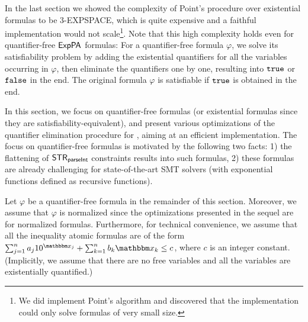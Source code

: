 
In the last section we showed the complexity of Point's procedure over existential {\paexp} formulas to be 3-EXPSPACE, which  is quite expensive and a faithful implementation would not scale\footnote{We did implement Point's algorithm and discovered that the implementation could only solve formulas of very small size.}.
Note that this high complexity holds even for quantifier-free ${\sf ExpPA}$ formulas: For a quantifier-free formula $\varphi$, we solve its satisfiability problem by adding the existential quantifiers for all the variables occurring in $\varphi$, then eliminate the quantifiers one by one, resulting into $\mathtt{true}$ or $\mathtt{false}$ in the end. The original formula $\varphi$ is satisfiable if $\mathtt{true}$ is obtained in the end.


In this section, we focus on quantifier-free {\paexp} formulas (or existential {\paexp} formulas since they are satisfiability-equivalent), and present various optimizations of the quantifier elimination procedure for {\paexp}, aiming at an efficient implementation. The focus on quantifier-free {\paexp} formulas is motivated by the following two facts: 1) the flattening of {${\sf STR}_{\textsf{parseInt}}$} constraints results into such formulas, 2) these formulas are already challenging for state-of-the-art SMT solvers (with exponential functions defined as recursive functions). 

Let $\varphi$ be a quantifier-free {\paexp} formula in the remainder of this section. Moreover, we assume that $\varphi$ is normalized since the optimizations presented in the sequel are for normalized formulas. Furthermore, for technical convenience, we assume that all the inequality atomic formulas are of the form 
%
$\sum_{j=1}^{n} a_j 10^{\ivarx_{j}} + \sum_{k=1}^{n}b_k \ivarx_{k} \le c$, 
%
where $c$ is an integer constant. (Implicitly, we assume that there are no free variables and all the variables are existentially quantified.)

